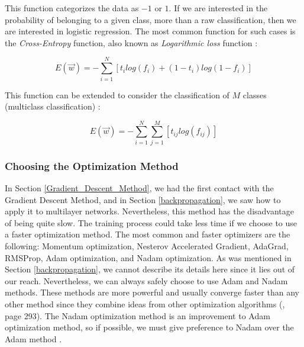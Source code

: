 This function categorizes the data as $-1$ or $1$. If we are interested in the probability of belonging to a given class, more than a raw classification,  then we are interested in logistic regression. The most common function for such cases is the \textit{Cross-Entropy} function, also known as \textit{Logarithmic loss} function \cite{machine_bishop} \cite{choose_fun_online2}:

\begin{equation}
	E(\vec{w})=-\sum_{i =1}^{N} [t_{i} log (f_{i}) + (1-t_{i}) log(1-f_{i}) ]
\end{equation}

This function can be extended to consider the classification of $M$ classes (multiclass classification) \cite{machine_bishop}:

\begin{equation}
	E(\vec{w})=-\sum_{i =1}^{N} \sum_{j =1}^{M}  [t_{ij}  log (f_{ij})]
\end{equation}

\subsubsection{Choosing the Optimization Method}
In Section \ref{Gradient_Descent_Method}, we had the first contact with the Gradient Descent Method, and in Section \ref{backpropagation}, we saw how to apply it to multilayer networks. Nevertheless, this method has the disadvantage of being quite slow. The training process could take less time if we choose to use a faster optimization method. The most common and faster optimizers are the following: Momentum optimization, Nesterov Accelerated Gradient, AdaGrad, RMSProp, Adam optimization, and Nadam optimization. As was mentioned in Section \ref{backpropagation}, we cannot describe its details here since it lies out of our reach. Nevertheless, we can always safely choose to use Adam and Nadam methods. These methods are more powerful and usually converge faster than any other method since they combine ideas from other optimization algorithms (\cite{machine_hands_on}, page 293). The Nadam optimization method is an improvement to Adam optimization method, so if possible, we must give preference to Nadam over the Adam method \cite{nadam}.

